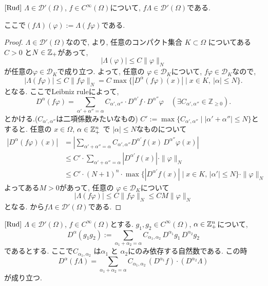 \begin{tcolorbox}[mybox]
\begin{lem}{$\cite[6.15]{Rud}$}
\label{lem-H-8}
\(\Lambda \in \mathcal{D}'(\Omega)\), \(f \in C^\infty(\Omega)\)について, 
\(f \Lambda \in \mathcal{D}'(\Omega)\)である. 
\end{lem}
\end{tcolorbox}
ここで$(f \Lambda)(\varphi ):=\Lambda (f \varphi)$である. 
\begin{proof}
\(\Lambda \in \mathcal{D}'(\Omega)\)なので, 
\cite[Thm 6.8]{Rud}より,
任意のコンパクト集合 \(K \subset \Omega\)
についてある\(C >0\) と\(N \in \mathbb{Z}_+\)があって, 
\[
|\Lambda(\varphi)| \le C \|\varphi\|_N
\]
が任意の\(\varphi \in \mathcal{D}_K\)で成り立つ. 
よって, 任意の \(\varphi \in \mathcal{D}_K\)について, 
$f \varphi \in \mathcal{D}_K$なので, 
\[
|\Lambda(f\varphi)| \le C \|f\varphi\|_N
= C \max \{ |D^\alpha(f\varphi)(x)| \mid x \in K, \ |\alpha| \le N \}.
\]
となる. ここでLeibniz ruleによって, 
\[
D^\alpha(f\varphi) = \sum_{\alpha' + \alpha'' = \alpha} C_{\alpha',\alpha''} \cdot D^{\alpha'} f \cdot D^{\alpha''} \varphi
\quad (\exists C_{\alpha',\alpha''} \in \mathbb{Z}_{\ge 0}).
\]
とかける.($C_{\alpha',\alpha''}$は二項係数みたいなもの) 
\(C' := \max \{ C_{\alpha',\alpha''} \mid |\alpha' + \alpha''| \le N \}\)とすると. 
任意の \(x \in \Omega\),  \(\alpha \in \mathbb{Z}_+^n\) で \(|\alpha| \le N\)なものについて
\begin{align*}
|D^{\alpha}(f\varphi)(x)|
&= \left| \sum_{\alpha' + \alpha'' = \alpha} 
   C_{\alpha',\alpha''} D^{\alpha'} f(x)\, D^{\alpha''}\varphi(x) \right| \\[6pt]
&\leq C' \cdot \sum_{\alpha' + \alpha'' = \alpha} 
   |D^{\alpha'} f(x)| \cdot \|\varphi\|_{N} \\[6pt]
&\leq C' \cdot (N+1)^n \cdot 
   \max \{ |D^{\alpha'} f(x)| \mid x \in K,\, |\alpha'|\leq N \} \cdot \|\varphi\|_{N}
\end{align*}
よってある$M>0$があって, 任意の \(\varphi \in \mathcal{D}_K\)について 
$$|\Lambda(f\varphi)| \le C \|f\varphi\|_N \le CM \|\varphi\|_N$$
となる. \cite[Thm 6.8]{Rud}から\(f\Lambda \in \mathcal{D}'(\Omega)\)である. 
\end{proof}

\begin{tcolorbox}[mybox]
\begin{lem}{$\cite[6.15]{Rud}$}
\label{lem-H-9}
\(\Lambda \in \mathcal{D}'(\Omega)\), \(f \in C^\infty(\Omega)\)とする. 
 \(g_1, g_2 \in C^\infty(\Omega)\), \(\alpha \in \mathbb{Z}_+^n\)について, 
\[
D^\alpha(g_1 g_2) 
:= \sum_{\alpha_1 + \alpha_2 = \alpha} C_{\alpha_1,\alpha_2} \, D^{\alpha_1} g_1 \, D^{\alpha_2} g_2
\]
であるとする. ここで\(C_{\alpha_1,\alpha_2}\) は\(\alpha_1\) と \(\alpha_2\)にのみ依存する自然数である. 
この時
\[
D^\alpha(f\Lambda) = \sum_{\alpha_1 + \alpha_2 = \alpha} C_{\alpha_1,\alpha_2} \, (D^{\alpha_1} f) \cdot (D^{\alpha_2} \Lambda)
\]
が成り立つ. 
\end{lem}
\end{tcolorbox}

